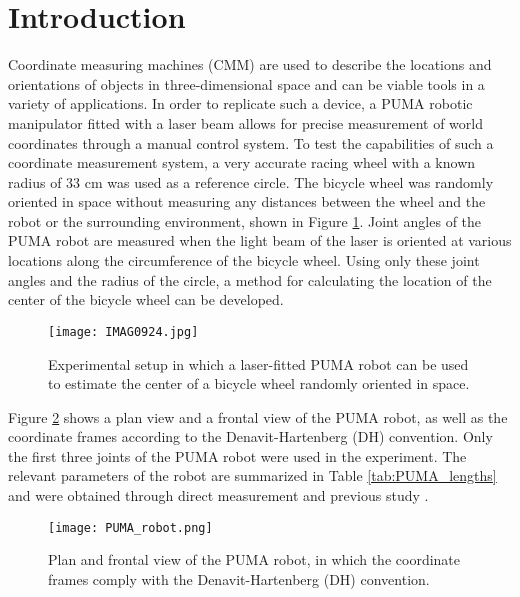 \documentclass[12pt]{article}
\begin{document}

\section{Introduction}

Coordinate measuring machines (CMM) are used to describe the locations and orientations of objects in three-dimensional space and can be viable tools in a variety of applications. In order to replicate such a device, a PUMA robotic manipulator fitted with a laser beam allows for precise measurement of world coordinates through a manual control system. To test the capabilities of such a coordinate measurement system, a very accurate racing wheel with a known radius of 33 cm was used as a reference circle. The bicycle wheel was randomly oriented in space without measuring any distances between the wheel and the robot or the surrounding environment, shown in Figure \ref{fig:PUMA_and_wheel}.  Joint angles of the PUMA robot are measured when the light beam of the laser is oriented at various locations along the circumference of the bicycle wheel.   Using only these joint angles and the radius of the circle, a method for calculating the location of the center of the bicycle wheel can be developed.  

\begin{figure}[!ht]
  {\texttt{[image: IMAG0924.jpg]}}
  \centering
  \caption{Experimental setup in which a laser-fitted PUMA robot can be used to estimate the center of a bicycle wheel randomly oriented in space.} 
  \centering
  \label{fig:PUMA_and_wheel}
\end{figure}
\noindent
Figure \ref{fig:PUMA_frames} shows a plan view and a frontal view of the PUMA robot, as well as the coordinate frames according to the Denavit-Hartenberg (DH) convention. Only the first three joints of the PUMA robot were used in the experiment. The relevant parameters of the robot are summarized in Table \ref{tab:PUMA_lengths} and were obtained through direct measurement and  previous study \cite{Corke}. 

\begin{figure}[!ht]
  {\texttt{[image: PUMA\_robot.png]}}
  \centering
  \caption{Plan and frontal view of the PUMA robot, in which the coordinate frames comply with the Denavit-Hartenberg (DH) convention.} 
  \centering
  \label{fig:PUMA_frames}
\end{figure}
\noindent
 
\end{document}
